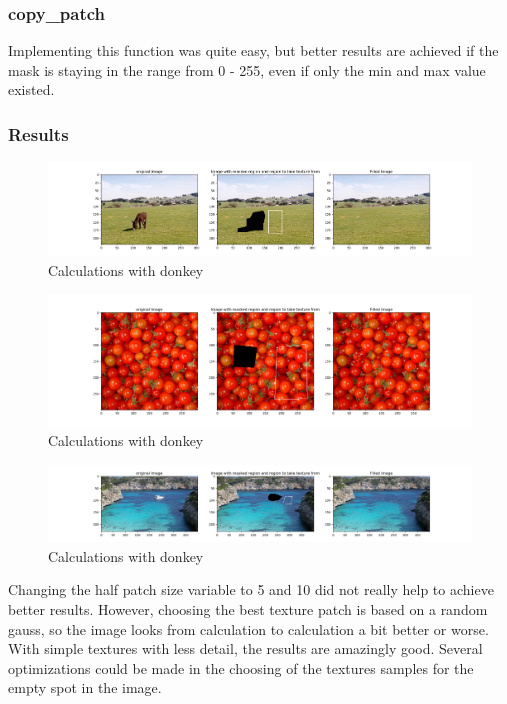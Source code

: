 \documentclass[12pt]{article}
\begin{document}
\subsubsection{copy\_patch}
Implementing this function was quite easy, but better results are achieved if the mask is staying in the range from 0 - 255, even if only the min and max value existed.
\newpage
\subsubsection{Results}
\begin{figure}[!htb]
  \centering
  \includegraphics[width=1.0\linewidth]{pics/hw3_ex_2_donkey}
  \caption{Calculations with donkey}
\end{figure}
\begin{figure}[!htb]
  \centering
  \includegraphics[width=1.0\linewidth]{pics/hw3_ex_2_tomato}
  \caption{Calculations with donkey}
\end{figure}
\begin{figure}[!htb]
  \centering
  \includegraphics[width=1.0\linewidth]{pics/hw3_ex_2_yacht}
  \caption{Calculations with donkey}
\end{figure}
\noindent Changing the half patch size variable to 5 and 10 did not really help to achieve better results. However, choosing the best texture patch is based on a random gauss, so the image looks from calculation to calculation a bit better or worse. With simple textures with less detail, the results are amazingly good. Several optimizations could be made in the choosing of the textures samples for the empty spot in the image.
\newpage
\end{document}
